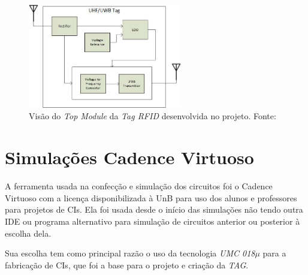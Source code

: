 \begin{figure}[htb]
	\centering
	\includegraphics[width=0.6\textwidth]{figuras/Top.jpg}
	\caption{Visão do \textit{Top Module} da \textit{Tag RFID} desenvolvida no projeto. Fonte:\cite{artigo_tag_unb} }
	\label{fig02}
\end{figure}



\section{Simulações Cadence Virtuoso }

A ferramenta usada na confecção e simulação dos circuitos foi o Cadence Virtuoso com a licença disponibilizada à UnB para uso dos alunos e professores para projetos de CIs. Ela foi usada desde o início das simulações não tendo outra IDE ou programa alternativo para simulação de circuitos anterior ou posterior à escolha dela.

Sua escolha tem como principal razão o uso da tecnologia \textit{UMC 018$\mu$} para a fabricação de CIs, que foi a base para o projeto e criação da \textit{TAG}. 




